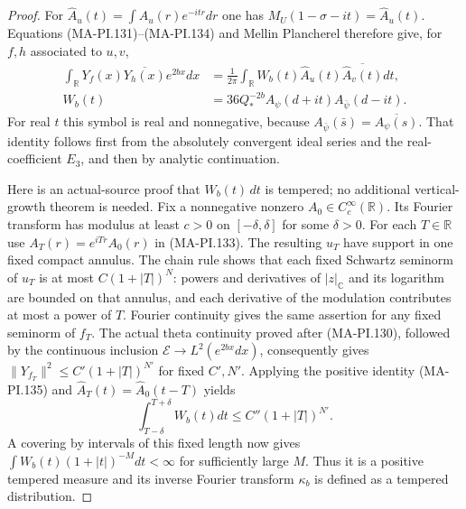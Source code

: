 \begin{proof}
For $\widehat A_u(t)=\int A_u(r)e^{-itr}dr$ one has
$M_U(1-\sigma-it)=\widehat A_u(t)$.
Equations (MA-PI.131)--(MA-PI.134) and Mellin Plancherel
therefore give, for $f,h$ associated to $u,v$,
\[
 \begin{split}
 \int_{\mathbb R}Y_f(x)\overline{Y_h(x)}e^{2bx}dx
   &=\frac1{2\pi}\int_{\mathbb R}
         W_b(t)\widehat A_u(t)\overline{\widehat A_v(t)}dt,\\
 W_b(t)&=36Q_*^{-2b}
             A_\psi(d+it)A_{\bar\psi}(d-it).
 \end{split}
 \tag{MA-PI.135}
\]
For real $t$ this symbol is real and nonnegative, because
$A_{\bar\psi}(\bar s)=\overline{A_\psi(s)}$.
That identity follows first from the absolutely convergent
ideal series and the real-coefficient $E_3$, and then by
analytic continuation.

Here is an actual-source proof that $W_b(t)\,dt$ is tempered;
no additional vertical-growth theorem is needed.
Fix a nonnegative nonzero $A_0\in C_c^\infty(\mathbb R)$.
Its Fourier transform has modulus at least $c>0$ on
$[-\delta,\delta]$ for some $\delta>0$.
For each $T\in\mathbb R$ use
$A_T(r)=e^{iTr}A_0(r)$ in (MA-PI.133).
The resulting $u_T$ have support in one fixed compact
annulus.  The chain rule shows that each fixed Schwartz
seminorm of $u_T$ is at most $C(1+|T|)^N$: powers and
derivatives of $|z|_{\mathbb C}$ and its logarithm are
bounded on that annulus, and each derivative of the
modulation contributes at most a power of $T$.
Fourier continuity gives the same assertion for any
fixed seminorm of $f_T$.  The actual theta continuity
proved after (MA-PI.130), followed by the continuous
inclusion $\mathcal E\to L^2(e^{2bx}dx)$, consequently gives
$\|Y_{f_T}\|^2\le C'(1+|T|)^{N'}$ for fixed $C',N'$.
Applying the positive identity (MA-PI.135) and
$\widehat A_T(t)=\widehat A_0(t-T)$ yields
\[
       \int_{T-\delta}^{T+\delta}W_b(t)dt
                         \le C''(1+|T|)^{N'}.
 \tag{MA-PI.136}
\]
A covering by intervals of this fixed length now gives
$\int W_b(t)(1+|t|)^{-M}dt<\infty$ for sufficiently
large $M$.  Thus it is a positive tempered measure and
its inverse Fourier transform $\kappa_b$ is defined
as a tempered distribution.


\end{proof}
